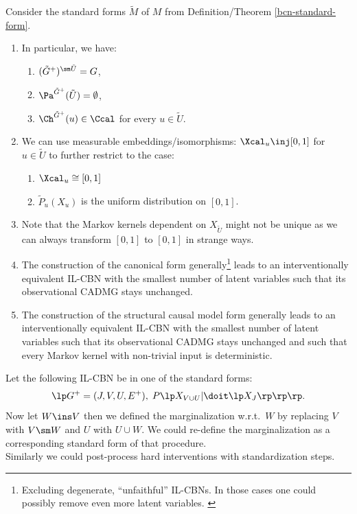 \begin{Rem} Consider the standard forms $\tilde M$ of $M$ from Definition/Theorem \ref{bcn-standard-form}.
    \begin{enumerate}
        \item In particular, we have:
    \begin{enumerate}
      \item $(\tilde G^+)^{\sm \tilde U} = G$,
     \item $\Pa^{\tilde G^+}(\tilde U) = \emptyset$,
     \item $\Ch^{\tilde G^+}(u) \in \Ccal$ for every $u \in \tilde U$.
    \end{enumerate}
  \item We can use measurable embeddings/isomorphisms: $\Xcal_u \inj [0,1]$ for $u \in \tilde U$ to further restrict to the case:
\begin{enumerate}
    \item $\Xcal_u \cong [0,1]$
    \item $\tilde P_u(X_u)$ is the uniform distribution on $[0,1]$.
\end{enumerate}
    \item Note that the Markov kernels dependent on $X_{\tilde U}$ might not be unique as we can always transform $[0,1]$ to $[0,1]$ in strange ways.
    \item The construction of the canonical form generally\footnote{Excluding degenerate, ``unfaithful'' IL-CBNs. In those cases one could possibly remove even more latent variables. \label{ref:can-form-deg}} leads to an interventionally equivalent IL-CBN with the smallest number of latent variables such that its observational CADMG stays unchanged. 
    \item The construction of the structural causal model form generally leads to an interventionally equivalent IL-CBN with the smallest number of latent variables such that its observational CADMG stays unchanged and such that every Markov kernel with non-trivial input is deterministic. 
    \end{enumerate}
\end{Rem}

\begin{Rem}
    Let the following IL-CBN be in one of the standard forms:    
    \[ \lp G^+=(J,V,U,E^+), \; P\lp X_{V \cup U}| \doit\lp X_{J} \rp\rp \rp.\]
    Now let $W \ins V$ then we defined the marginalization w.r.t.\ $W$ by replacing $V$ with $V \sm W$ and $U$ with $U \cup W$.
    We could re-define the marginalization as a corresponding standard form of that procedure.\\
    Similarly we could post-process hard interventions with standardization steps.
\end{Rem}




